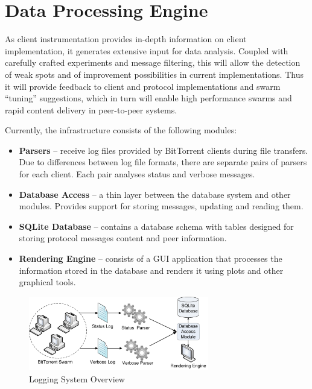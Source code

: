 \section{Data Processing Engine}
\label{sec:proto-measure:data-processing}


As client instrumentation provides in-depth information on client
implementation, it generates extensive input for data analysis. Coupled
with carefully crafted experiments and message filtering, this will allow
the detection of weak spots and of improvement possibilities in current
implementations. Thus it will provide feedback to client and protocol
implementations and swarm ``tuning'' suggestions, which in turn will enable
high performance swarms and rapid content delivery in peer-to-peer systems.

Currently, the infrastructure consists of the following modules:

\begin{itemize}
  \item \textbf{Parsers} -- receive log files provided by BitTorrent
clients during file transfers. Due to differences between log file formats,
there are separate pairs of parsers for each client. Each pair analyses status
and verbose messages.
  \item \textbf{Database Access} -- a thin layer between the database system and
other modules. Provides support for storing messages, updating and reading
them.
  \item \textbf{SQLite Database} -- contains a database schema with tables
designed for storing protocol messages content and peer information.
  \item \textbf{Rendering Engine} -- consists of a GUI application that
processes the information stored in the database and renders it using plots
and other graphical tools.
\end{itemize}

\begin{figure}[h]
  \begin{center}
    \includegraphics[width=0.7\textwidth]{src/img/proto-measure/logarch-not-use}
  \end{center}
  \caption{Logging System Overview}
  \label{fig:proto-measure:logarch}
\end{figure}


